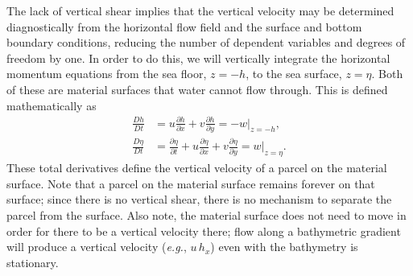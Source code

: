 \documentclass[11pt]{report}
\numberwithin{equation}{section}
\begin{document}
The lack of vertical shear implies that the vertical velocity may be determined diagnostically from the horizontal flow field and the surface and bottom boundary conditions, reducing the number of dependent variables and degrees of freedom by one.  In order to do this, we will vertically integrate the horizontal momentum equations from the sea floor, $z=-h$, to the sea surface, $z=\eta$.  Both of these are material surfaces that water cannot flow through.  This is defined mathematically as
\begin{align}
    \frac{D h}{Dt} &= u \frac{\partial h}{\partial x} + v \frac{\partial h}{\partial y} = -w|_{z=-h} \label{eq:h_cons}, \\
    \frac{D \eta}{Dt} &= \frac{\partial \eta}{\partial t} + u \frac{\partial \eta}{\partial x} + v \frac{\partial \eta}{\partial y} = w|_{z=\eta}. \label{eq:eta_cons}
\end{align}
These total derivatives define the vertical velocity of a parcel on the material surface.  Note that a parcel on the material surface remains forever on that surface; since there is no vertical shear, there is no mechanism to separate the parcel from the surface.  Also note, the material surface does not need to move in order for there to be a vertical velocity there; flow along a bathymetric gradient will produce a vertical velocity (\emph{e.g.}, $u\,h_x$) even with the bathymetry is stationary.
\end{document}
